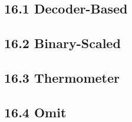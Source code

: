 \subsection{16.1 Decoder-Based}
\subsection{16.2 Binary-Scaled}
\subsection{16.3 Thermometer}
\subsection{16.4 Omit}
